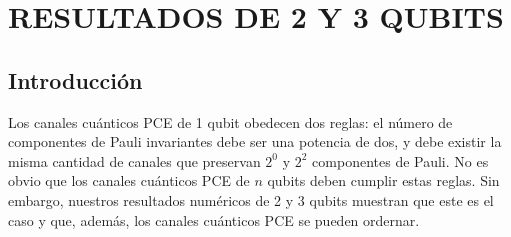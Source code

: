 \chapter{RESULTADOS DE 2 Y 3 QUBITS}
\section{Introducción} %
Los canales cuánticos PCE de 1 qubit obedecen dos reglas:
el número de componentes de Pauli invariantes 
debe ser una potencia de dos, y debe existir la misma cantidad de canales que preservan 
$2^0$ y $2^2$ componentes de Pauli. No es obvio que los canales cuánticos PCE
de $n$ qubits deben cumplir estas reglas. Sin embargo, 
nuestros resultados numéricos de 2 y 3 qubits muestran que este
es el caso y que, además, los canales cuánticos PCE se pueden ordernar.

